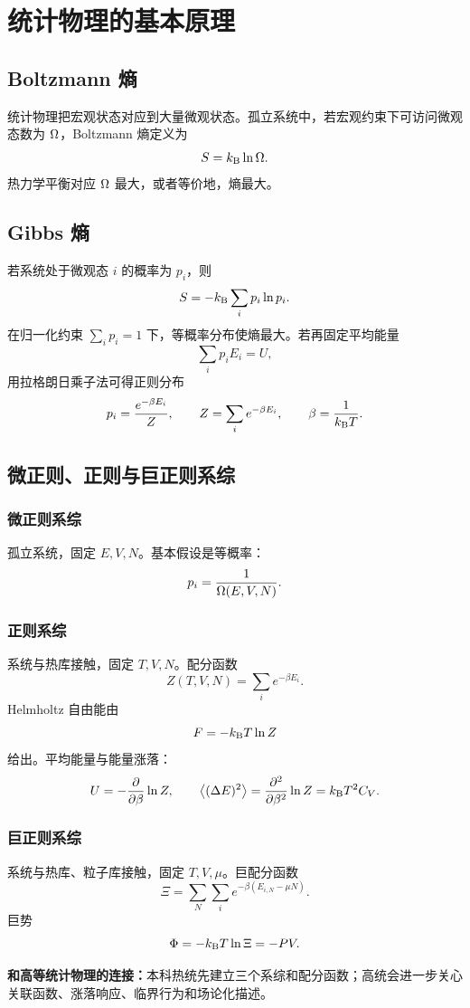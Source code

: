 \chapter{统计物理的基本原理}

\section{Boltzmann 熵}

统计物理把宏观状态对应到大量微观状态。孤立系统中，若宏观约束下可访问微观态数为 $\micro$，Boltzmann 熵定义为
\[
  S=\kb\ln \micro .
\]
热力学平衡对应 $\micro$ 最大，或者等价地，熵最大。

\section{Gibbs 熵}

若系统处于微观态 $i$ 的概率为 $p_i$，则
\[
  S=-\kb\sum_i p_i\ln p_i .
\]
在归一化约束 $\sum_i p_i=1$ 下，等概率分布使熵最大。若再固定平均能量
\[
  \sum_i p_iE_i=U,
\]
用拉格朗日乘子法可得正则分布
\[
  p_i=\frac{e^{-\beta E_i}}{Z},\qquad
  Z=\sum_i e^{-\beta E_i},\qquad
  \beta=\frac{1}{\kb T}.
\]

\section{微正则、正则与巨正则系综}

\subsection*{微正则系综}

孤立系统，固定 $E,V,N$。基本假设是等概率：
\[
  p_i=\frac{1}{\micro(E,V,N)}.
\]

\subsection*{正则系综}

系统与热库接触，固定 $T,V,N$。配分函数
\[
  Z(T,V,N)=\sum_i e^{-\beta E_i}.
\]
Helmholtz 自由能由
\[
  F=-\kb T\ln Z
\]
给出。平均能量与能量涨落：
\[
  U=-\frac{\partial}{\partial\beta}\ln Z,\qquad
  \avg{(\Delta E)^2}=\frac{\partial^2}{\partial\beta^2}\ln Z=\kb T^2C_V.
\]

\subsection*{巨正则系综}

系统与热库、粒子库接触，固定 $T,V,\mu$。巨配分函数
\[
  \Xi=\sum_N\sum_i e^{-\beta(E_{i,N}-\mu N)}.
\]
巨势
\[
  \Phi=-\kb T\ln\Xi=-PV.
\]

\begin{keybox}
\textbf{和高等统计物理的连接：}本科热统先建立三个系综和配分函数；高统会进一步关心关联函数、涨落响应、临界行为和场论化描述。
\end{keybox}

